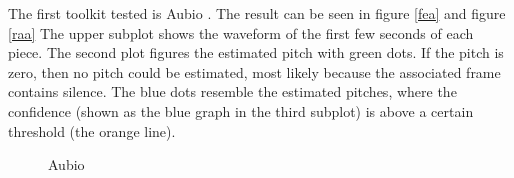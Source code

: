 The first toolkit tested is Aubio \cite{aubio1}. The result can be seen in figure \ref{fea} and figure \ref{raa}
The upper subplot shows the waveform of the first few seconds of each piece. The second plot figures the estimated pitch with green dots. If the pitch is zero, then no pitch could be estimated, most likely because the associated frame contains silence. The blue dots resemble the estimated pitches, where the confidence (shown as the blue graph in the third subplot) is above a certain threshold (the orange line).

\begin{figure}[htbp]
	\centering
	\caption{Aubio}
	\label{fig:aubio}
\end{figure}
\FloatBarrier

